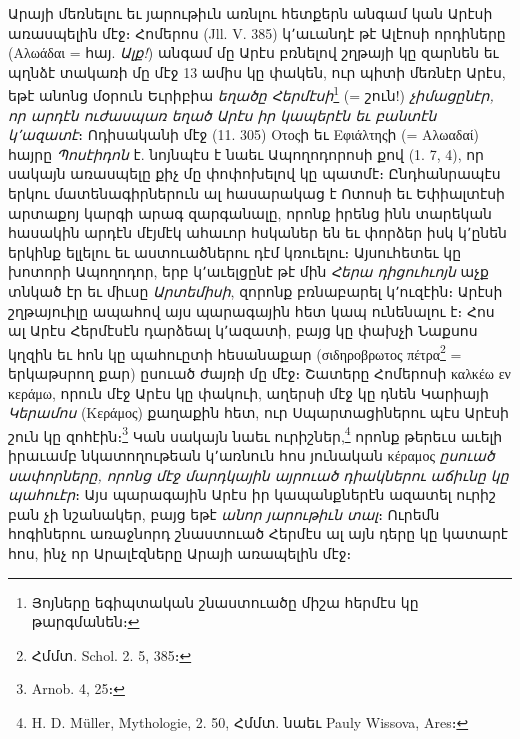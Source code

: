 \documentclass{article}
\begin{document}
{Արայի մեռնելու եւ յարութիւն առնլու հետքերն անգամ կան Արէսի առասպելին մէջ։ Հոմերոս (Jll. V. 385) կ՚աւանդէ թէ Ալէոսի որդիները (Αλωάδαι = հայ. \emph{Ալք!}) անգամ մը Արէս բռնելով շղթայի կը զարնեն եւ պղնձէ տակառի մը մէջ 13 ամիս կը փակեն, ուր պիտի մեռնէր Արէս, եթէ անոնց մօրուն Եւրիբիա \emph{եղածը Հերմէսի}\footnote{Յոյները եգիպտական շնաստուածը միշա հերմէս կը թարգմանեն։} (= շուն!) \emph{չիմացընէր, որ արդէն ուժասպառ եղած Արէս իր կապերէն եւ բանտէն կ՚ազատէ}։ Ոդիսականի մէջ (11. 305) Οτοςի եւ Εφιάλτηςի (= Αλωαδαί) հայրը \emph{Պոսէիդոն} է. նոյնպէս է նաեւ Ապողոդորոսի քով (1. 7, 4), որ սակայն առասպելը քիչ մը փոփոխելով կը պատմէ։ Ընդհանրապէս երկու մատենագիրներուն ալ հասարակաց է Ոտոսի եւ Եփիալտէսի արտաքոյ կարգի արագ զարգանալը, որոնք իրենց ինն տարեկան հասակին արդէն մէյմէկ ահաւոր հսկաներ են եւ փորձեր իսկ կ՚ընեն երկինք ելլելու եւ աստուածներու դէմ կռուելու։ Այսուհետեւ կը խոտորի Ապողոդոր, երբ կ՚աւելցընէ թէ մին \emph{Հերա դիցուհւոյն} աչք տնկած էր եւ միւսը \emph{Արտեմիսի}, զորոնք բռնաբարել կ՚ուզէին։ Արէսի շղթայուիլը ապահով այս պարագային հետ կապ ունենալու է։ Հոս ալ Արէս Հերմէսէն դարձեալ կ՚ազատի, բայց կը փախչի Նաքսոս կղզին եւ հոն կը պահուըտի հեսանաքար (σιδηροβρωτος πέτρα\footnote{Հմմտ. Schol. 2. 5, 385։} = երկաթսրող քար) ըսուած ժայռի մը մէջ։ Շատերը Հոմերոսի καλκέω εν κεράμω, որուն մէջ Արէս կը փակուի, աղերսի մէջ կը դնեն Կարիայի \emph{Կերամոս} (Κεράμος) քաղաքին հետ, ուր Սպարտացիներու պէս Արէսի շուն կը զոհէին։\footnote{Arnob. 4, 25։} Կան սակայն նաեւ ուրիշներ,\footnote{H. D. Müller, Mythologie, 2. 50, Հմմտ. նաեւ Pauly Wissova, Ares։} որոնք թերեւս աւելի իրաւամբ նկատողութեան կ՚առնուն հոս յունական κέραμος \emph{ըսուած սափորները, որոնց մէջ մարդկային այրուած դիակներու աճիւնը կը պահուէր}։ Այս պարագային Արէս իր կապանքներէն ազատել ուրիշ բան չի նշանակեր, բայց եթէ \emph{անոր յարութիւն տալ}։ Ուրեմն հոգիներու առաջնորդ շնաստուած Հերմէս ալ այն դերը կը կատարէ հոս, ինչ որ Արալէզները Արայի առապելին մէջ։

}
\end{document}
